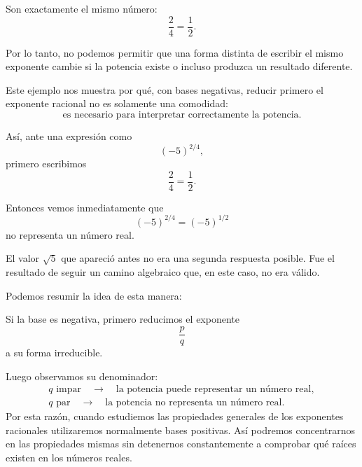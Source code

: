 Son exactamente el mismo número:
\[
\frac24=\frac12.
\]

Por lo tanto, no podemos permitir que una forma distinta de escribir el mismo exponente cambie si la potencia existe o incluso produzca un resultado diferente.

Este ejemplo nos muestra por qué, con bases negativas, reducir primero el exponente racional no es solamente una comodidad:
\[
\boxed{\text{es necesario para interpretar correctamente la potencia.}}
\]

Así, ante una expresión como
\[
(-5)^{2/4},
\]
primero escribimos
\[
\frac24=\frac12.
\]

Entonces vemos inmediatamente que
\[
(-5)^{2/4}
=
(-5)^{1/2}
\]
no representa un número real.

El valor \(\sqrt5\) que apareció antes no era una segunda respuesta posible. Fue el resultado de seguir un camino algebraico que, en este caso, no era válido.

Podemos resumir la idea de esta manera:

Si la base es negativa, primero reducimos el exponente
\[
\frac pq
\]
a su forma irreducible.

Luego observamos su denominador:
\[
\boxed{
\begin{array}{c}
q\text{ impar} \quad\longrightarrow\quad
\text{la potencia puede representar un número real},\\[4pt]
q\text{ par} \quad\longrightarrow\quad
\text{la potencia no representa un número real}.
\end{array}
}
\]
Por esta razón, cuando estudiemos las propiedades generales de los exponentes racionales utilizaremos normalmente bases positivas. Así podremos concentrarnos en las propiedades mismas sin detenernos constantemente a comprobar qué raíces existen en los números reales.
